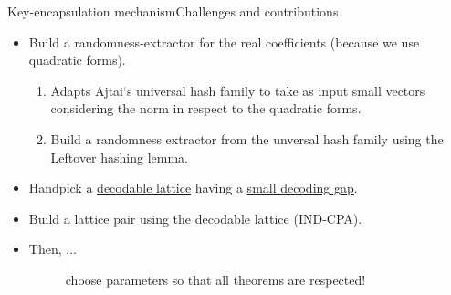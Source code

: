 \documentclass[10pt]{beamer}
\begin{document}
\begin{frame}{Key-encapsulation mechanism}{Challenges and contributions}
				\begin{itemize}\setlength\itemsep{1em}
								\item Build a randomness-extractor for the real coefficients (because we use quadratic forms).
												\begin{enumerate}\setlength\itemsep{0.5em}
																\item Adapts Ajtai`s universal hash family to take as input small vectors considering the norm in respect to the quadratic forms.
																\item Build a randomness extractor from the unversal hash family using the Leftover hashing lemma.
												\end{enumerate}
								\item Handpick a \underline{decodable lattice} having a \underline{small decoding gap}.
								\item Build a lattice pair using the decodable lattice (IND-CPA).
								\item Then, $\ldots$
												\begin{figure}
																{\color{red} \large choose parameters so that all theorems are respected!}
												\end{figure}
				\end{itemize}
\end{frame}
\end{document}
